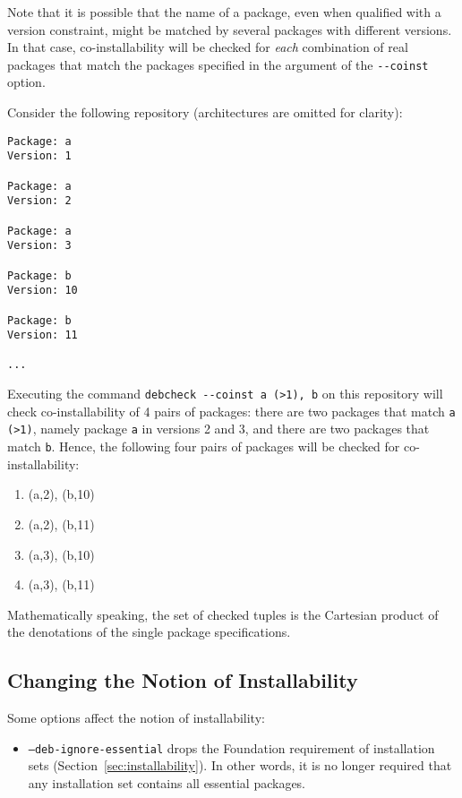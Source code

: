 Note that it is possible that the name of a package, even when
qualified with a version constraint, might be matched by several
packages with different versions. In that case, co-installability will
be checked for \emph{each} combination of real packages that match the
packages specified in the argument of the \verb|--coinst| option.
\begin{example}
  Consider the following repository (architectures are omitted for
  clarity):
\begin{verbatim}
Package: a
Version: 1

Package: a 
Version: 2

Package: a
Version: 3

Package: b
Version: 10

Package: b
Version: 11

...
\end{verbatim}
Executing the command \verb|debcheck --coinst a (>1), b| on this
repository will check co-installability of 4 pairs of packages: there
are two packages that match \verb|a (>1)|, namely package \texttt{a} in
versions 2 and 3, and there are two packages that match \texttt{b}. Hence,
the following four pairs of packages will be checked for co-installability:
\begin{enumerate}
\item (a,2), (b,10)
\item (a,2), (b,11)
\item (a,3), (b,10)
\item (a,3), (b,11)
\end{enumerate}
\end{example}

Mathematically speaking, the set of checked tuples is the Cartesian product
of the denotations of the single package specifications.

\subsection{Changing the Notion of Installability}

Some options affect the notion of installability:
\begin{itemize}
\item \texttt{--deb-ignore-essential} drops the Foundation requirement
  of installation sets (Section~\ref{sec:installability}). In other
  words, it is no longer required that any installation set contains all
  essential packages.
\end{itemize}

